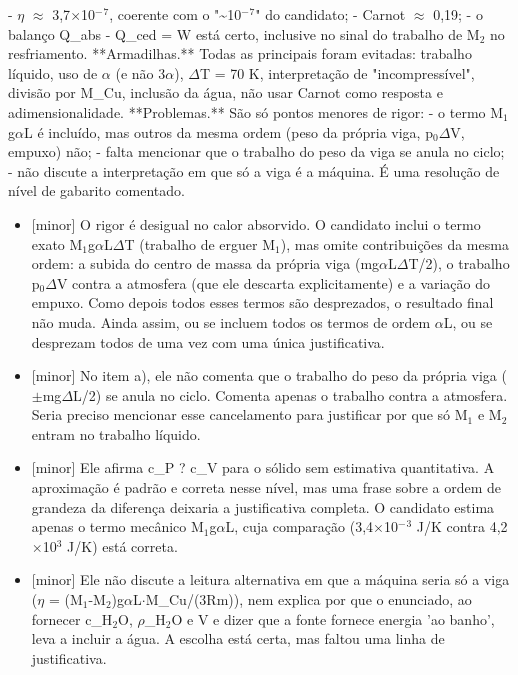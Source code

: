 \documentclass{article}%
\begin{document}
{-} $\eta$ $\approx$ 3,7$\times$10$^{-}$$^{7}$, coerente com o "\textasciitilde{}10$^{-}$$^{7}$" do candidato;\newline%
{-} Carnot $\approx$ 0,19;\newline%
{-} o balanço Q\_abs - Q\_ced = W está certo, inclusive no sinal do trabalho de M$_{2}$ no resfriamento.\newline%
\newline%
**Armadilhas.** Todas as principais foram evitadas: trabalho líquido, uso de $\alpha$ (e não 3$\alpha$), $\Delta$T = 70 K, interpretação de "incompressível", divisão por M\_Cu, inclusão da água, não usar Carnot como resposta e adimensionalidade.\newline%
\newline%
**Problemas.** São só pontos menores de rigor:\newline%
{-} o termo M$_{1}$g$\alpha$L é incluído, mas outros da mesma ordem (peso da própria viga, p$_{0}$$\Delta$V, empuxo) não;\newline%
{-} falta mencionar que o trabalho do peso da viga se anula no ciclo;\newline%
{-} não discute a interpretação em que só a viga é a máquina.\newline%
\newline%
É uma resolução de nível de gabarito comentado.%
\begin{itemize}%
\item%
{[}minor{]} O rigor é desigual no calor absorvido. O candidato inclui o termo exato M$_{1}$g$\alpha$L$\Delta$T (trabalho de erguer M$_{1}$), mas omite contribuições da mesma ordem: a subida do centro de massa da própria viga (mg$\alpha$L$\Delta$T/2), o trabalho p$_{0}$$\Delta$V contra a atmosfera (que ele descarta explicitamente) e a variação do empuxo. Como depois todos esses termos são desprezados, o resultado final não muda. Ainda assim, ou se incluem todos os termos de ordem $\alpha$L, ou se desprezam todos de uma vez com uma única justificativa.%
\item%
{[}minor{]} No item a), ele não comenta que o trabalho do peso da própria viga ($\pm$mg$\Delta$L/2) se anula no ciclo. Comenta apenas o trabalho contra a atmosfera. Seria preciso mencionar esse cancelamento para justificar por que só M$_{1}$ e M$_{2}$ entram no trabalho líquido.%
\item%
{[}minor{]} Ele afirma c\_P ? c\_V para o sólido sem estimativa quantitativa. A aproximação é padrão e correta nesse nível, mas uma frase sobre a ordem de grandeza da diferença deixaria a justificativa completa. O candidato estima apenas o termo mecânico M$_{1}$g$\alpha$L, cuja comparação (3,4$\times$10$^{-}$$^3$ J/K contra 4,2$\times$10$^3$ J/K) está correta.%
\item%
{[}minor{]} Ele não discute a leitura alternativa em que a máquina seria só a viga ($\eta$ = (M$_{1}$-M$_{2}$)g$\alpha$L$\cdot$M\_Cu/(3Rm)), nem explica por que o enunciado, ao fornecer c\_H$_{2}$O, $\rho$\_H$_{2}$O e V e dizer que a fonte fornece energia 'ao banho', leva a incluir a água. A escolha está certa, mas faltou uma linha de justificativa.%
\end{itemize}%
\end{document}
